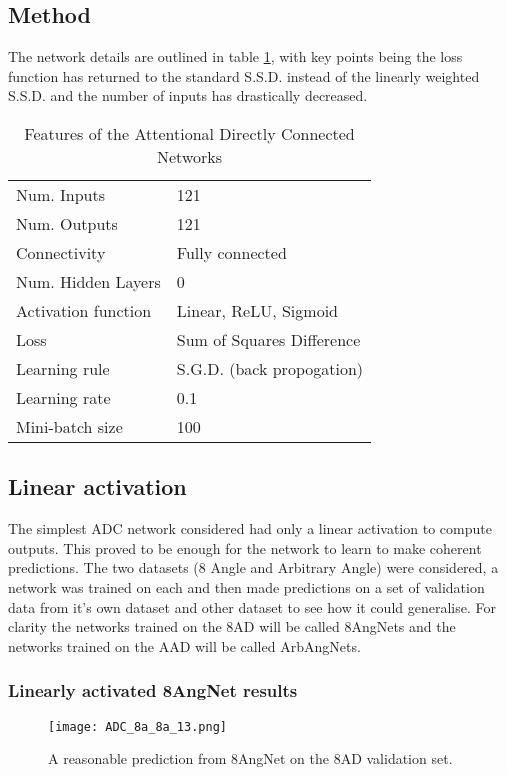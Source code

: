 \subsection{Method}
The network details are outlined in table \ref{tb:attnet1def}, with key points being the loss function has returned to the standard S.S.D. instead of the linearly weighted S.S.D. and the number of inputs has drastically decreased. 

\begin{table}[h]
\centering
\begin{tabular}{ | l | l | }
    \hline
    Num. Inputs & 121 \\
    Num. Outputs & 121 \\
    Connectivity & Fully connected \\
    Num. Hidden Layers & 0 \\
    Activation function & Linear, ReLU, Sigmoid \\
    Loss & Sum of Squares Difference \\
    Learning rule & S.G.D. (back propogation) \\
    Learning rate & 0.1 \\
    Mini-batch size & 100 \\
    \hline
\end{tabular}
\caption{Features of the Attentional Directly Connected Networks}
\label{tb:attnet1def}
\end{table}

\subsection{Linear activation}
The simplest ADC network considered had only a linear activation to compute outputs. 
This proved to be enough for the network to learn to make coherent predictions. 
The two datasets (8 Angle and Arbitrary Angle) were considered, a network was trained on each and then made predictions on a set of validation data from it's own dataset and other dataset to see how it could generalise.
For clarity the networks trained on the 8AD will be called 8AngNets and the networks trained on the AAD will be called ArbAngNets. 

\subsubsection{Linearly activated 8AngNet results}

\begin{figure}
    \centering
    \texttt{[image: ADC\_8a\_8a\_13.png]}
    \caption{A reasonable prediction from 8AngNet on the 8AD validation set.}
    \label{fig:ADC_8a_8a_crct} 
\end{figure}

